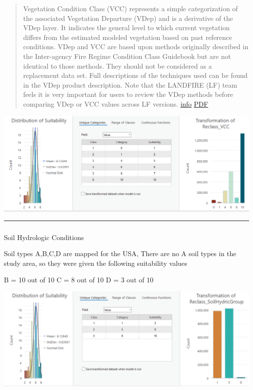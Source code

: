 \documentclass[
  number]{elsarticle}
\makeatletter
\let\oldsubparagraph\subparagraph
\renewcommand{\subparagraph}{
    \@ifstar
      \xxxSubParagraphStar
      \xxxSubParagraphNoStar
  }
\newcommand{\xxxSubParagraphStar}[1]{\oldsubparagraph*{#1}\mbox{}}
\newcommand{\xxxSubParagraphNoStar}[1]{\oldsubparagraph{#1}\mbox{}}
\makeatother
\begin{document}
\begin{quote}
Vegetation Condition Class (VCC) represents a simple categorization of
the associated Vegetation Departure (VDep) and is a derivative of the
VDep layer. It indicates the general level to which current vegetation
differs from the estimated modeled vegetation based on past reference
conditions. VDep and VCC are based upon methods originally described in
the Inter-agency Fire Regime Condition Class Guidebook but are not
identical to those methods. They should not be considered as a
replacement data set. Full descriptions of the techniques used can be
found in the VDep product description. Note that the LANDFIRE (LF) team
feels it is very important for users to review the VDep methods before
comparing VDep or VCC values across LF versions.
\href{https://www.landfire.gov/vegetation/vcc}{info}
\href{https://www.landfire.gov/sites/default/files/DataDictionary/LF2022/LF22_VCCADD_230.pdf}{PDF}
\end{quote}

\includegraphics{images/VCC_suitability.PNG}

\begin{center}\rule{0.5\linewidth}{0.5pt}\end{center}

\subparagraph{Soil Hydrologic
Conditions}\label{soil-hydrologic-conditions}

Soil types A,B,C,D are mapped for the USA, There are no A soil types in
the study area, so they were given the following suitability values

B = 10 out of 10 C = 8 out of 10 D = 3 out of 10

\includegraphics{images/SoilHydrologicGroup_suitability.PNG}
\end{document}
